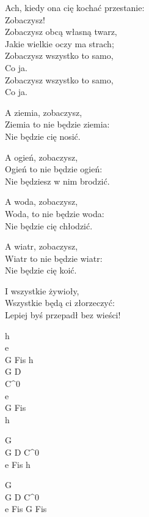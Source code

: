 \begin{text}
	Ach, kiedy ona cię kochać przestanie:\\
	Zobaczysz!\\
	Zobaczysz obcą własną twarz,\\
	Jakie wielkie oczy ma strach;\\
	Zobaczysz wszystko to samo,\\
	Co ja.\\
	Zobaczysz wszystko to samo,\\
	Co ja.

	A ziemia, zobaczysz,\\
	Ziemia to nie będzie ziemia:\\
	Nie będzie cię nosić.

	A ogień, zobaczysz,\\
	Ogień to nie będzie ogień:\\
	Nie będziesz w nim brodzić.

	A woda, zobaczysz,\\
	Woda, to nie będzie woda:\\
	Nie będzie cię chłodzić.

	A wiatr, zobaczysz,\\
	Wiatr to nie będzie wiatr:\\
	Nie będzie cię koić.

	I wszystkie żywioły,\\
	Wszystkie będą ci złorzeczyć:\\
	Lepiej byś przepadł bez wieści!
\end{text}
\begin{chord}
	h\\
	e\\
	G Fis h\\
	G D\\
	C^0\\
	e\\
	G Fis\\
	h

	G\\
	G D C^0\\
	e Fis h

	G\\
	G D C^0\\
	e Fis G Fis
\end{chord}
